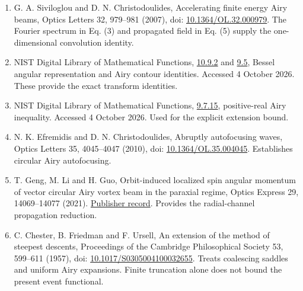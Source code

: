 \documentclass[11pt]{article}
\providecommand{\tightlist}{\setlength{\itemsep}{0pt}\setlength{\parskip}{0pt}}
\begin{document}
\begin{enumerate}
\def\labelenumi{\arabic{enumi}.}
\tightlist
\item
  G. A. Siviloglou and D. N. Christodoulides, Accelerating finite energy
  Airy beams, Optics Letters 32, 979--981 (2007), doi:
  \href{https://doi.org/10.1364/OL.32.000979}{10.1364/OL.32.000979}.
  The Fourier spectrum in Eq. (3) and propagated field in Eq. (5)
  supply the one-dimensional convolution identity.
\item
  NIST Digital Library of Mathematical Functions,
  \href{https://dlmf.nist.gov/10.9.E2}{10.9.2} and
  \href{https://dlmf.nist.gov/9.5}{9.5}, Bessel angular representation
  and Airy contour identities. Accessed 4 October 2026. These provide
  the exact transform identities.
\item
  NIST Digital Library of Mathematical Functions,
  \href{https://dlmf.nist.gov/9.7.E15}{9.7.15}, positive-real Airy
  inequality. Accessed 4 October 2026. Used for the explicit extension
  bound.
\item
  N. K. Efremidis and D. N. Christodoulides, Abruptly autofocusing
  waves, Optics Letters 35, 4045--4047 (2010), doi:
  \href{https://doi.org/10.1364/OL.35.004045}{10.1364/OL.35.004045}.
  Establishes circular Airy autofocusing.
\item
  T. Geng, M. Li and H. Guo, Orbit-induced localized spin angular
  momentum of vector circular Airy vortex beam in the paraxial regime,
  Optics Express 29, 14069--14077 (2021).
  \href{https://opg.optica.org/oe/abstract.cfm?uri=oe-29-9-14069}{Publisher
  record}. Provides the radial-channel propagation reduction.
\item
  C. Chester, B. Friedman and F. Ursell, An extension of the method of
  steepest descents, Proceedings of the Cambridge Philosophical Society
  53, 599--611 (1957), doi:
  \href{https://doi.org/10.1017/S0305004100032655}{10.1017/S0305004100032655}.
  Treats coalescing saddles and uniform Airy expansions. Finite
  truncation alone does not bound the present event functional.
\end{enumerate}
\end{document}
